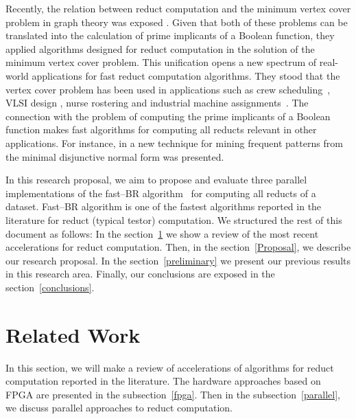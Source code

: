 \documentclass[citenumber]{elsarticle}
\begin{document}
	Recently, the relation between reduct computation and the minimum vertex cover problem in graph theory was exposed \cite{chen2015}. Given that both of these problems can be translated into the calculation of prime implicants of a Boolean function, they applied algorithms designed for reduct computation in the solution of the minimum vertex cover problem. This unification opens a new spectrum of real-world applications for fast reduct computation algorithms. They stood that the vertex cover problem has been used in applications such as crew scheduling~\cite{Sherali1984}, VLSI design \cite{Bhattacharyya2000}, nurse rostering \cite{Caprara1998} and industrial machine assignments~\cite{Woodyatt1993}. The connection with the problem of computing the prime implicants of a Boolean function makes fast algorithms for computing all reducts relevant in other applications. For instance, in \cite{Li2015} a new technique for mining frequent patterns from the minimal disjunctive normal form was presented.
	
	In this research proposal, we aim to propose and evaluate three parallel implementations of the fast--BR algorithm~\cite{Lias13} for computing all reducts of a dataset. Fast--BR algorithm is one of the fastest algorithms reported in the literature for reduct (typical testor) computation. We structured the rest of this document as follows: In the section~\ref{relatedWork} we show a review of the most recent accelerations for reduct computation. Then, in the section~\ref{Proposal}, we describe our research proposal. In the section~\ref{preliminary} we present our previous results in this research area. Finally, our conclusions are exposed in the section~\ref{conclusions}.
%

\section{Related Work}\label{relatedWork}
 	In this section, we will make a review of accelerations of algorithms for reduct computation reported in the literature. The hardware approaches based on FPGA are presented in the subsection~\ref{fpga}. Then in the subsection~\ref{parallel}, we discuss parallel approaches to reduct computation.
%	
\end{document}
